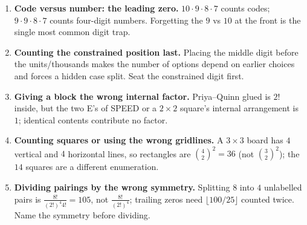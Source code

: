 \documentclass[11pt,a4paper]{article}
\begin{document}
\begin{enumerate}[leftmargin=2em, itemsep=4pt]
  \item \textbf{Code versus number: the leading zero.} $10\cdot9\cdot8\cdot7$ counts codes; $9\cdot9\cdot8\cdot7$ counts four-digit numbers. Forgetting the $9$ vs $10$ at the front is the single most common digit trap. 
  \item \textbf{Counting the constrained position last.} Placing the middle digit before the units/thousands makes the number of options depend on earlier choices and forces a hidden case split. Seat the constrained digit first. 
  \item \textbf{Giving a block the wrong internal factor.} Priya--Quinn glued is $2!$ inside, but the two E's of SPEED or a $2\times2$ square's internal arrangement is $1$; identical contents contribute no factor. 
  \item \textbf{Counting squares or using the wrong gridlines.} A $3\times3$ board has $4$ vertical and $4$ horizontal lines, so rectangles are $\binom{4}{2}^2=36$ (not $\binom{3}{2}^2$); the $14$ squares are a different enumeration. 
  \item \textbf{Dividing pairings by the wrong symmetry.} Splitting $8$ into $4$ unlabelled pairs is $\frac{8!}{(2!)^4 4!}=105$, not $\frac{8!}{(2!)^4}$; trailing zeros need $\lfloor100/25\rfloor$ counted twice. Name the symmetry before dividing. 
\end{enumerate}

\end{document}
